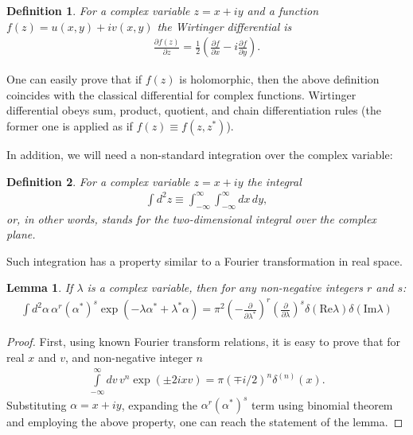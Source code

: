 \documentclass[12pt,aip,jmp,amssymb,amsmath]{revtex4-1}
\newcommand{\Real}{\mathrm{Re}}
\newcommand{\Imag}{\mathrm{Im}}
\newtheorem{definition}{Definition}
\newtheorem{lemma}{Lemma}
\begin{document}
\begin{definition}
    For a complex variable $z = x + iy$ and a function $f(z) = u(x, y) + iv(x, y)$ the Wirtinger differential is
    \begin{equation*}\begin{split}
        \frac{\partial f(z)}{\partial z}
        = \frac{1}{2} \left(
            \frac{\partial f}{\partial x} - i \frac{\partial f}{\partial y}
        \right).
    \end{split}\end{equation*}
\end{definition}

One can easily prove that if $f(z)$ is holomorphic, then the above definition coincides with the classical differential for complex functions.
Wirtinger differential obeys sum, product, quotient, and chain differentiation rules (the former one is applied as if $f(z) \equiv f(z, z^*)$).

In addition, we will need a non-standard integration over the complex variable:

\begin{definition}
    For a complex variable $z = x + iy$ the integral
    \begin{equation*}\begin{split}
        \int d^2 z \equiv \int_{-\infty}^{\infty} \int_{-\infty}^{\infty} dx\, dy,
    \end{split}\end{equation*}
    or, in other words, stands for the two-dimensional integral over the complex plane.
\end{definition}

Such integration has a property similar to a Fourier transformation in real space.

\begin{lemma}
\label{lmm:c-numbers:fourier-of-moments}
    If $\lambda$ is a complex variable, then for any non-negative integers $r$ and $s$:
    \begin{equation*}\begin{split}
        \int d^2\alpha\, \alpha^r (\alpha^*)^s \exp(-\lambda \alpha^* + \lambda^* \alpha)
        = \pi^2
            \left( -\frac{\partial}{\partial \lambda^*} \right)^r
            \left( \frac{\partial}{\partial \lambda} \right)^s
            \delta(\Real \lambda) \delta(\Imag \lambda)
    \end{split}\end{equation*}
\end{lemma}
\begin{proof}
First, using known Fourier transform relations, it is easy to prove that for real $x$ and $v$, and non-negative integer $n$
\begin{equation*}\begin{split}
    \int\limits_{-\infty}^{\infty} dv\, v^n \exp(\pm 2 i x v)
    = \pi (\mp i / 2)^n \delta^{(n)}(x).
\end{split}\end{equation*}
Substituting $\alpha = x + iy$, expanding the $\alpha^r (\alpha^*)^s$ term using binomial theorem and employing the above property, one can reach the statement of the lemma.
\end{proof}
\end{document}
